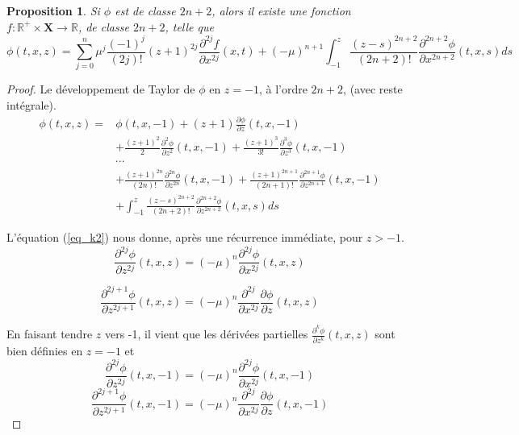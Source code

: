 \documentclass[12pt,a4paper]{article}
\newtheorem{prop}[dfn]{\textbf{Proposition}}
\numberwithin{equation}{section}
\begin{document}
\begin{prop}
    Si $\phi$ est de classe $2n+2$, alors il existe une fonction $f:\mathbb{R}^+\times\textbf{X}\rightarrow \mathbb{R}$, de classe $2n+2$, telle que
    \begin{equation}
        \phi (t,x,z) = \sum_{j = 0}^{n} \mu^j\frac{(-1)^j}{(2j)!} (z+1)^{2j}\frac{\partial^{2j}f}{\partial x^{2j}}(x,t)
        + (-\mu)^{n+1}\int_{-1}^z\frac{(z-s)^{2n+2}}{(2n+2)!}\frac{\partial^{2n+2} \phi}{\partial x^{2n+2}}(t,x,s)ds
    \end{equation}
\end{prop}
\begin{proof}
Le développement de Taylor de $\phi$ en $z = -1$, à l'ordre $2n+2$, (avec reste intégrale).
\begin{equation*}
\begin{split}
    \phi(t,x,z) = &\phi(t,x,-1) + (z+1)\frac{\partial \phi}{\partial z}(t,x,-1)\\
    &+ \frac{(z+1)^2}{2}\frac{\partial^2 \phi}{\partial z^2}(t,x,-1) + \frac{(z+1)^3}{3!}\frac{\partial^3 \phi}{\partial z^3}(t,x,-1)\\
    & \cdots\\
    &+ \frac{(z+1)^{2n}}{(2n)!}\frac{\partial^{2n} \phi}{\partial z^{2n}}(t,x,-1) + \frac{(z+1)^{2n+1}}{(2n+1)!}\frac{\partial^{2n+1} \phi}{\partial z^{2n+1}}(t,x,-1)\\
    &+\int_{-1}^z\frac{(z-s)^{2n+2}}{(2n+2)!}\frac{\partial^{2n+2} \phi}{\partial z^{2n+2}}(t,x,s)ds
\end{split}
\end{equation*}

L'équation (\ref{eq_k2}) nous donne, après une récurrence immédiate, pour $z>-1$.
\begin{equation*}
    \frac{\partial^{2j} \phi}{\partial z^{2j}}(t,x,z) = (-\mu)^{n}\frac{\partial^{2j} \phi}{\partial x^{2j}}(t,x,z)
\end{equation*}

\begin{equation*}
    \frac{\partial^{2j+1} \phi}{\partial z^{2j+1}}(t,x,z) = (-\mu)^{n}\frac{\partial^{2j}}{\partial x^{2j}}\frac{\partial \phi}{\partial z}(t,x,z)
\end{equation*}

En faisant tendre $z$ vers -1, il vient que les dérivées partielles $\frac{\partial^{k} \phi}{\partial z^{k}}(t,x,z)$ sont bien définies en $z = -1$ et 
\begin{equation*}
    \frac{\partial^{2j} \phi}{\partial z^{2j}}(t,x,-1) = (-\mu)^{n}\frac{\partial^{2j} \phi}{\partial x^{2j}}(t,x,-1)
\end{equation*}
\begin{equation*}
    \frac{\partial^{2j+1} \phi}{\partial z^{2j+1}}(t,x,-1) = (-\mu)^{n}\frac{\partial^{2j}}{\partial x^{2j}}\frac{\partial \phi}{\partial z}(t,x,-1)
\end{equation*}


\end{proof}
\end{document}
